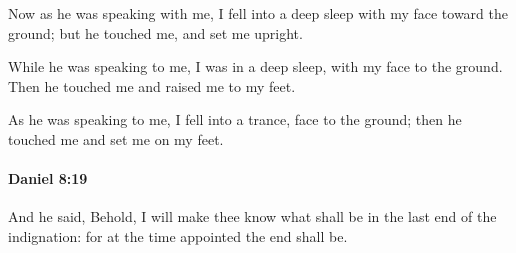 			\begin{versebox}
					\item[BHS] 
					\item[LXX] 
					\item[ASV] Now as he was speaking with me, I fell into a deep sleep with my face toward the ground; but he touched me, and set me upright.
					\item[NIV] While he was speaking to me, I was in a deep sleep, with my face to the ground. Then he touched me and raised me to my feet.
					\item[NRSV] As he was speaking to me, I fell into a trance, face to the ground; then he touched me and set me on my feet.
			\end{versebox}

		\paragraph{Daniel 8:19} %
			\label{DANIEL-8-19}

			And he said, Behold, I will make thee know what shall be in the last end of the indignation: for at the time appointed the end shall be.

